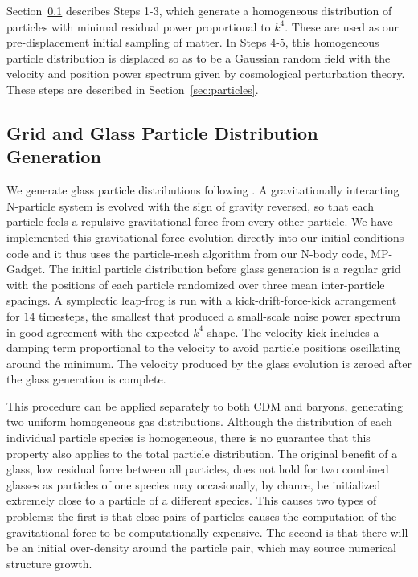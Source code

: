 \documentclass[a4paper,11pt]{article}
\begin{document}
Section~\ref{sec:glass} describes Steps 1-3, which generate a homogeneous distribution of particles with minimal residual power proportional to $k^4$. These are used as our pre-displacement initial sampling of matter. In Steps 4-5, this homogeneous particle distribution is displaced so as to be a Gaussian random field with the velocity and position power spectrum given by cosmological perturbation theory. These steps are described in Section~\ref{sec:particles}.

\subsection{Grid and Glass Particle Distribution Generation}
\label{sec:glass}

We generate glass particle distributions following \cite{White:1994}. A gravitationally interacting N-particle system is evolved with the sign of gravity reversed, so that each particle feels a repulsive gravitational force from every other particle. We have implemented this gravitational force evolution directly into our initial conditions code and it thus uses the particle-mesh algorithm from our N-body code, MP-Gadget. The initial particle distribution before glass generation is a regular grid with the positions of each particle randomized over three mean inter-particle spacings. A symplectic leap-frog is run with a kick-drift-force-kick arrangement for $14$ timesteps, the smallest that produced a small-scale noise power spectrum in good agreement with the expected $k^4$ shape. The velocity kick includes a damping term proportional to the velocity to avoid particle positions oscillating around the minimum. The velocity produced by the glass evolution is zeroed after the glass generation is complete.

This procedure can be applied separately to both CDM and baryons, generating two uniform homogeneous gas distributions.
Although the distribution of each individual particle species is homogeneous, there is no guarantee that this property also applies to the total particle distribution. The original benefit of a glass, low residual force between all particles, does not hold for two combined glasses \cite{Yoshida:2003} as particles of one species may occasionally, by chance, be initialized extremely close to a particle of a different species. This causes two types of problems: the first is that close pairs of particles causes the computation of the gravitational force to be computationally expensive. The second is that there will be an initial over-density around the particle pair, which may source numerical structure growth.
\end{document}
